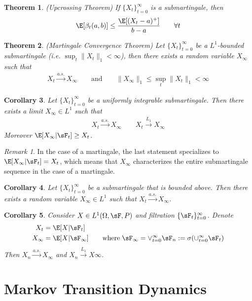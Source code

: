 \documentclass[12pt]{article}
\theoremstyle{plain}
\newtheorem{thm}{Theorem}[section]
\newtheorem{cor}[thm]{Corollary}
\theoremstyle{definition}
\theoremstyle{remark}
\newtheorem*{rmk}{Remark}
\newcommand{\asto}{\xrightarrow{a.s.}}
\newcommand{\Lqto}[1]{\xrightarrow{L_{#1}}}
\newcommand{\tinfz}{_{t=0}^\infty}
\begin{document}
\begin{thm}\emph{(Upcrossing Theorem)}
If $\{X_t\}\tinfz$ is a submartingale, then
\begin{align*}
  \E[\beta_t(a,b)]
  \leq
  \frac{\E[(X_t-a)^+]}{b-a}
  \qquad \forall t
\end{align*}
\end{thm}

\begin{thm}\emph{(Martingale Convergence Theorem)}
Let $\{X_t\}\tinfz$ be a $L^1$-bounded submartingale (i.e.
$\sup_t\lVert X_t\rVert_1<\infty$), then there exists a random variable
$X_\infty$ such that
\begin{align*}
  X_t \asto X_\infty
  \qquad\text{and}\qquad
  \lVert X_\infty\rVert_1 \leq \sup_t \lVert X_t\rVert_1 < \infty
\end{align*}
\end{thm}

\begin{cor}
Let $\{X_t\}\tinfz$ be a uniformly integrable submartingale. Then there
exists a limit $X_\infty\in L^1$ such that
\begin{align*}
  X_t\asto X_\infty
  \qquad
  X_t \Lqto{1} X_\infty
\end{align*}
Moreover
$\E[X_\infty|\sF_t] \geq X_t$.
\end{cor}
\begin{rmk}
In the case of a martingale, the last statement specializes to
$\E[X_\infty|\sF_t] = X_t$, which means that $X_\infty$ characterizes
the entire submartingale sequence in the case of a martingale.
\end{rmk}

\begin{cor}
Let $\{X_t\}\tinfz$ be a submartingale that is bounded above.
Then there exists a random variable $X_\infty\in L^1$ such that
$X_t\asto X_\infty$.
\end{cor}

\begin{cor}
Consider $X\in L^1(\Omega,\sF,P)$ and filtration $\{\sF_t\}\tinfz$.
Denote
\begin{align*}
  X_t &= \E[X|\sF_t] \\
  X_\infty &= \E[X|\sF_\infty]
  \qquad
  \text{where} \;
  \sF_\infty=\vee\tinfz \sF_n := \sigma(\cup\tinfz \sF_t)
\end{align*}
Then $X_n\asto X_\infty$ and $X_n\Lqto{1} X\infty$.
\end{cor}

\clearpage
\section{Markov Transition Dynamics}
\end{document}
